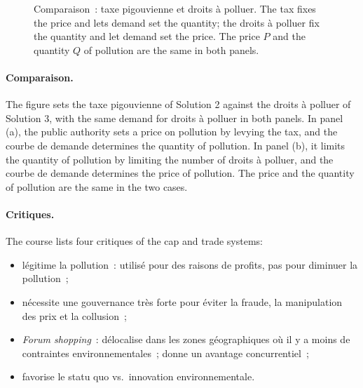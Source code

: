 \begin{figure}[h!]
  \caption*{\small Comparaison~: taxe pigouvienne et droits à polluer. The tax fixes
  the price and lets demand set the quantity; the droits à polluer fix the quantity
  and let demand set the price. The price $P$ and the quantity $Q$ of pollution are
  the same in both panels.}
\end{figure}

\paragraph{Comparaison.} The figure sets the taxe pigouvienne of Solution 2 against
the droits à polluer of Solution 3, with the same demand for droits à polluer in
both panels. In panel (a), the public authority sets a price on pollution by
levying the tax, and the courbe de demande determines the quantity of pollution. In
panel (b), it limits the quantity of pollution by limiting the number of droits à
polluer, and the courbe de demande determines the price of pollution. The price and the
quantity of pollution are the same in the two cases.

\paragraph{Critiques.} The course lists four critiques of the cap and trade
systems:
\begin{itemize}
  \item légitime la pollution~: utilisé pour des raisons de profits, pas pour
    diminuer la pollution~;
  \item nécessite une gouvernance très forte pour éviter la fraude, la
    manipulation des prix et la collusion~;
  \item \emph{Forum shopping}~: délocalise dans les zones géographiques où il y a
    moins de contraintes environnementales~; donne un avantage concurrentiel~;
  \item favorise le statu quo vs.\ innovation environnementale.
\end{itemize}

